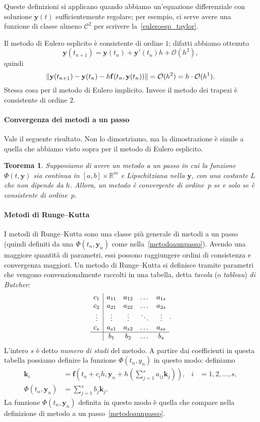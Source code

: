 \documentclass[a4paper]{report}
\DeclarePairedDelimiter{\norm}{\lVert}{\rVert}
\newtheorem{theorem}{Teorema}[chapter]
\theoremstyle{definiton}
\theoremstyle{remark}
\newcommand{\y}{\mathbf{y}}
\newcommand{\f}{\mathbf{f}}
\begin{document}
Queste definizioni si applicano quando abbiamo un'equazione differenziale con soluzione $\y(t)$ sufficientemente regolare; per esempio, ci serve avere una funzione di classe almeno $\mathcal{C}^2$ per scrivere la~\eqref{euleroesp_taylor}.

Il metodo di Eulero esplicito è consistente di ordine $1$; difatti abbiamo ottenuto
\[
\y(t_{n+1}) = \y(t_n) + \y'(t_n)h + \mathcal{O}(h^2),
\]
quindi
\[
\norm*{\y(t_{n+1}) - \y(t_n) - h \f(t_n, \y(t_n))} = \mathcal{O}(h^2) = h \cdot \mathcal{O}(h^1).
\]
Stessa cosa per il metodo di Eulero implicito. Invece il metodo dei trapezi è consistente di ordine $2$.

\paragraph{Convergenza dei metodi a un passo}
Vale il seguente risultato. Non lo dimostriamo, ma la dimostrazione è simile a quella che abbiamo visto sopra per il metodo di Eulero esplicito.
\begin{theorem}
Supponiamo di avere un metodo a un passo in cui la funzione $\Phi(t,\y)$ sia continua in $[a,b] \times \mathbb{R}^m$ e Lipschitziana nella $\y$, con una costante $L$ che non dipende da $h$.
Allora, un metodo è convergente di ordine~$p$ se e solo se è consistente di ordine~$p$.
\end{theorem}


\paragraph{Metodi di Runge--Kutta} I metodi di Runge--Kutta sono una classe più generale di metodi a un passo (quindi definiti da una $\Phi(t_n,\y_n)$ come nella~\eqref{metodoaunpasso}). Avendo una maggiore quantità di parametri, essi possono raggiungere ordini di consistenza e convergenza maggiori. Un metodo di Runge--Kutta si definisce tramite parametri che vengono convenzionalmente raccolti in una tabella, detta \emph{tavola} (o \emph{tableau}) \emph{di Butcher}:
\[
\begin{array}{c|cccc}
c_1 & a_{11} & a_{12} & \dots & a_{1s}\\
c_2 & a_{21} & a_{22} & \dots & a_{2s}\\
\vdots & \vdots & \vdots & \ddots & \vdots\\
c_s & a_{s1} & a_{s2} & \dots & a_{ss}\\
\hline
& b_1 & b_2 & \dots & b_s
\end{array}.
\]
L'intero $s$ è detto \emph{numero di stadi} del metodo. A partire dai coefficienti in questa tabella possiamo definire la funzione $\Phi(t_n,y_n)$ in questo modo: definiamo
\begin{align*}
    \mathbf{k}_i &= \mathbf{f}\left(t_n + c_i h, \y_n + h\left(\sum_{j=1}^s a_{ij}\mathbf{k}_j\right)\right), & i&=1,2,\dots,s,\\
    \Phi(t_n, \mathbf{y}_n) &= \sum_{j=1}^s b_j \mathbf{k}_j.
\end{align*}
La funzione $\Phi(t_n, \mathbf{y}_n)$ definita in questo modo è quella che compare nella definizione di metodo a un passo~\eqref{metodoaunpasso}.
\end{document}
